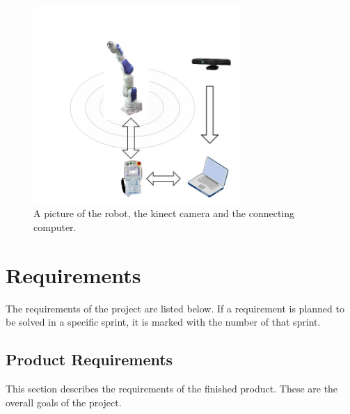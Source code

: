 \documentclass[10pt,a4paper]{article}
\begin{document}
\begin{figure}[H] 
  \centering
    \includegraphics[width = 0.7\textwidth]{robot.jpg}
    \caption{A picture of the robot, the kinect camera and the connecting computer.}
    \label{fig:safetyzone}
\end{figure}


\section{Requirements}
The requirements of the project are listed below. If a requirement is planned to be solved in a specific sprint, it is marked with the number of that sprint. 
{\addtolength{\leftskip}{10mm}
\subsection{Product Requirements}
This section describes the requirements of the finished product. These are the overall goals of the project. \par}
\end{document}
